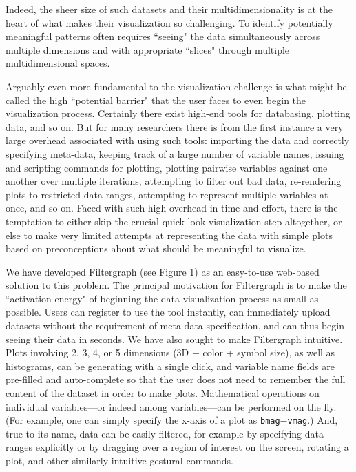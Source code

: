 Indeed, the sheer size of such datasets and their multidimensionality is at the heart of what makes their visualization so challenging. To identify potentially meaningful patterns often requires ``seeing" the data simultaneously across multiple dimensions and with appropriate ``slices" through multiple multidimensional spaces.

Arguably even more fundamental to the visualization challenge is what might be called the high ``potential barrier" that the user faces to even begin the visualization process. Certainly there exist high-end tools for databasing, plotting data, and so on. But for many researchers there is from the first instance a very large overhead associated with using such tools: importing the data and correctly specifying meta-data, keeping track of a large number of variable names, issuing and scripting commands for plotting, plotting pairwise variables against one another over multiple iterations, attempting to filter out bad data, re-rendering plots to restricted data ranges, attempting to represent multiple variables at once, and so on. Faced with such high overhead in time and effort, there is the temptation to either skip the crucial quick-look visualization step altogether, or else to make very limited attempts at representing the data with simple plots based on preconceptions about what should be meaningful to visualize.

We have developed Filtergraph (see Figure 1) as an easy-to-use web-based solution to this problem. The principal motivation for Filtergraph is to make the ``activation energy" of beginning the data visualization process as small as possible. Users can register to use the tool instantly, can immediately upload datasets without the requirement of meta-data specification, and can thus begin seeing their data in seconds. We have also sought to make Filtergraph intuitive. Plots involving 2, 3, 4, or 5 dimensions (3D + color + symbol size), as well as histograms, can be generating with a single click, and variable name fields are pre-filled and auto-complete so that the user does not need to remember the full content of the dataset in order to make plots. Mathematical operations on individual variables---or indeed among variables---can be performed on the fly. (For example, one can simply specify the x-axis of a plot as {\tt bmag}$-${\tt vmag}.) And, true to its name, data can be easily filtered, for example by specifying data ranges explicitly or by dragging over a region of interest on the screen, rotating a plot, and other similarly intuitive gestural commands.

